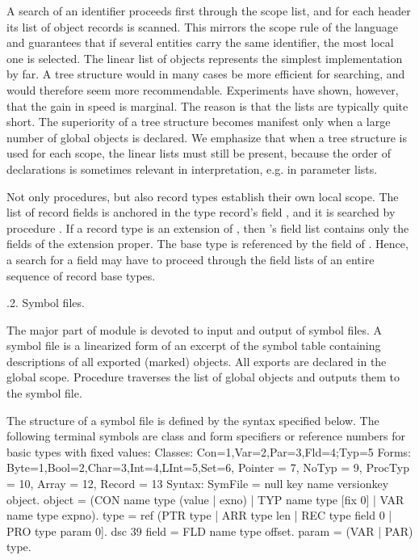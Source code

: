 A search of an identifier proceeds first through the scope list, and for each header its list of object records is scanned. This mirrors the scope rule of the language and guarantees that if several entities carry the same identifier, the most local one is selected. The linear list of objects represents the simplest implementation by far. A tree structure would in many cases be more efficient for searching, and would therefore seem more recommendable. Experiments have shown, however, that the gain in speed is marginal. The reason is that the lists are typically quite short. The superiority of a tree structure becomes manifest only when a large number of global objects is declared. We emphasize that when a tree structure is used for each scope, the linear lists must still be present, because the order of declarations is sometimes relevant in interpretation, e.g. in parameter lists.

Not only procedures, but also record types establish their own local scope. The list of record fields is anchored in the type record's field , and it is searched by procedure . If a record type  is an extension of , then 's field list contains only the fields of the extension proper. The base type  is referenced by the  field of . Hence, a search for a field may have to proceed through the field lists of an entire sequence of record base types.

.2. Symbol files.

The major part of module  is devoted to input and output of symbol files. A symbol file is a linearized form of an excerpt of the symbol table containing descriptions of all exported (marked) objects. All exports are declared in the global scope. Procedure  traverses the list of global objects and outputs them to the symbol file.

The structure of a symbol file is defined by the syntax specified below. The following terminal symbols are class and form specifiers or reference numbers for basic types with fixed values:
\begintt
Classes: Con=1,Var=2,Par=3,Fld=4;Typ=5
Forms: Byte=1,Bool=2,Char=3,Int=4,LInt=5,Set=6, Pointer = 7, NoTyp = 9, ProcTyp = 10, Array = 12, Record = 13
Syntax:
SymFile = null key name versionkey {object}.
object = (CON name type (value | exno) | TYP name type [{fix} 0] | VAR name type expno). type = ref (PTR type | ARR type len | REC type {field} 0 | PRO type {param} 0].
dsc
39
field = FLD name type offset. param = (VAR | PAR) type.
\endtt

